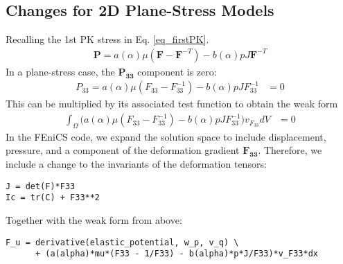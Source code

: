 \documentclass[12pt,3p]{article}
\numberwithin{equation}{section}
\begin{document}
\subsection{Changes for 2D Plane-Stress Models}
Recalling the 1st PK stress in Eq. \ref{eq_firstPK}.
\begin{align*}
\mathbf{P} = a (\alpha) \mu (\mathbf{F} - \mathbf{F}^{-T}) - b (\alpha) p J \mathbf{F}^{-T}
\end{align*}
In a plane-stress case, the $\mathbf{P_{33}}$ component is zero:
\begin{align*}
{P}_{33} = a (\alpha) \mu ({F}_{33} - {F}^{-1}_{33}) - b (\alpha) p J {F}^{-1}_{33} &= 0 
\end{align*}
This can be multiplied by its associated test function to obtain the weak form 
\begin{align*}
\int_{\Omega} \bigg(a (\alpha) \mu ({F}_{33} - {F}^{-1}_{33}) - b (\alpha) p J {F}^{-1}_{33} \bigg) v_{F_{33}} dV &= 0
\end{align*}
In the FEniCS code, we expand the solution space to include displacement, pressure, and a component of the deformation gradient $\mathbf{F_{33}}$. Therefore, we include a change to the invariants of the deformation tensors: 
\begin{lstlisting}
J = det(F)*F33
Ic = tr(C) + F33**2
\end{lstlisting}
Together with the weak form from above: 
\begin{lstlisting}
F_u = derivative(elastic_potential, w_p, v_q) \
      + (a(alpha)*mu*(F33 - 1/F33) - b(alpha)*p*J/F33)*v_F33*dx
\end{lstlisting}

\end{document}
